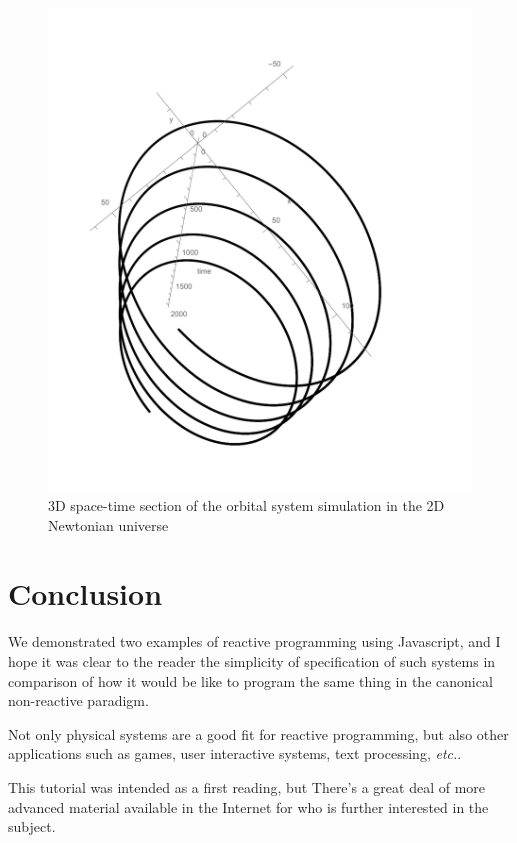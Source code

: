 \documentclass[notitlepage]{article}
\begin{document}
\begin{figure}
    \centering
    \includegraphics[width=\linewidth,bb=0 0 576 656]{images/orbit-chart.pdf}
    \caption{3D space-time section of the orbital system simulation in the 2D Newtonian universe}
    \label{fig:orbit-chart}
\end{figure}

\section{Conclusion}

We demonstrated two examples of reactive programming using Javascript, and I
hope it was clear to the reader the simplicity of specification of such systems
in comparison of how it would be like to program the same thing in the
canonical non-reactive paradigm.

Not only physical systems are a good fit for reactive programming, but also
other applications such as games, user interactive systems, text processing,
\textit{etc.}.

This tutorial was intended as a first reading, but There's a great deal of more
advanced material available in the Internet for who is further interested in
the subject.
\end{document}
